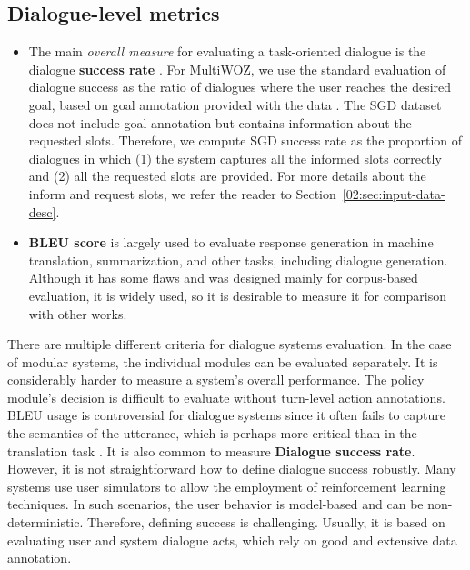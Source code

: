 \subsection{Dialogue-level metrics}
    \begin{itemize}
        \item The main \emph{overall measure} for evaluating a task-oriented dialogue is the dialogue \textbf{success rate} \cite{deriu_survey_2021}.
For MultiWOZ, we use the standard evaluation of dialogue success as the ratio of dialogues where the user reaches the desired goal, based on goal annotation provided with the data \cite{nekvinda-dusek-2021-shades}. 
The SGD dataset does not include goal annotation but contains information about the requested slots. Therefore, we compute SGD success rate as the proportion of dialogues in which (1) the system captures all the informed slots correctly and (2) all the requested slots are provided.
For more details about the inform and request slots, we refer the reader to Section~\ref{02:sec:input-data-desc}.
    \item  \textbf{BLEU score} \cite{papineni-etal-2002-bleu} is largely used to evaluate response generation in machine translation, summarization, and other tasks, including dialogue generation.
    Although it has some flaws \cite{callison-burch-etal-2006-evaluating} and was designed mainly for corpus-based evaluation, it is widely used, so it is desirable to measure it for comparison with other works.
\end{itemize}

There are multiple different criteria for dialogue systems evaluation.
In the case of modular systems, the individual modules can be evaluated separately.
It is considerably harder to measure a system's overall performance.
The policy module's decision is difficult to evaluate without turn-level action annotations.
BLEU usage is controversial for dialogue systems since it often fails to capture the semantics of the utterance, which is perhaps more critical than in the translation task \cite{lowe2017towards}.
It is also common to measure \textbf{Dialogue success rate}.
However, it is not straightforward how to define dialogue success robustly.
Many systems use user simulators to allow the employment of reinforcement learning techniques.
In such scenarios, the user behavior is model-based and can be non-deterministic. Therefore, defining success is challenging.
Usually, it is based on evaluating user and system dialogue acts, which rely on good and extensive data annotation.

